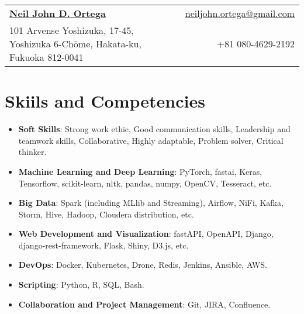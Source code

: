 \documentclass[letterpaper,11pt]{article}
\newcommand{\resumeItemInline}[2]{
  \item\small{
    \textbf{#1}{: #2 \vspace{-2pt}}
  }
}
\newcommand{\resumeSubItemInline}[2]{\resumeItemInline{#1}{#2}\vspace{-6pt}}
\newcommand{\resumeSubHeadingListStart}{\begin{itemize}[leftmargin=*]}
\newcommand{\resumeSubHeadingListEnd}{\end{itemize}\vspace{-5pt}}
\begin{document}
\begin{tabular*}{\textwidth}{l@{\extracolsep{\fill}}r}
  \textbf{\href{https://www.linkedin.com/in/neiljdo/}{\Large Neil John D. Ortega}} & \href{mailto:neiljohn.ortega@gmail.com}{neiljohn.ortega@gmail.com}\\
  101 Arvense Yoshizuka, 17-45, Yoshizuka 6-Chōme, Hakata-ku, Fukuoka 812-0041 & +81 080-4629-2192\\
\end{tabular*}


\section{Skiils and Competencies}
  \resumeSubHeadingListStart
    \resumeSubItemInline{Soft Skills}
      {Strong work ethic, Good communication skills, Leadership and teamwork skills, Collaborative, Highly adaptable, Problem solver, Critical thinker.}
    \resumeSubItemInline{Machine Learning and Deep Learning}
      {PyTorch, fastai, Keras, Tensorflow, scikit-learn, nltk, pandas, numpy, OpenCV, Tesseract, etc.}
    \resumeSubItemInline{Big Data}
      {Spark (including MLlib and Streaming), Airflow, NiFi, Kafka, Storm, Hive, Hadoop, Cloudera distribution, etc.}
    \resumeSubItemInline{Web Development and Visualization}
      {fastAPI, OpenAPI, Django, django-rest-framework, Flask, Shiny, D3.js, etc.}
    \resumeSubItemInline{DevOps}
      {Docker, Kubernetes, Drone, Redis, Jenkins, Ansible, AWS.}
    \resumeSubItemInline{Scripting}
      {Python, R, SQL, Bash.}
    \resumeSubItemInline{Collaboration and Project Management}
      {Git, JIRA, Confluence.}
  \resumeSubHeadingListEnd


\end{document}
